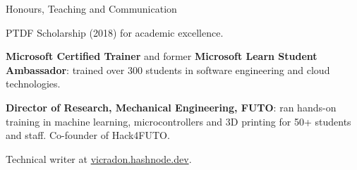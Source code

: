 \documentclass{resume}
\begin{document}
\begin{rSection}{Honours, Teaching and Communication}
\item PTDF Scholarship (2018) for academic excellence.
\item \textbf{Microsoft Certified Trainer} and former \textbf{Microsoft Learn Student Ambassador}: trained over 300 students in software engineering and cloud technologies.
\item \textbf{Director of Research, Mechanical Engineering, FUTO}: ran hands-on training in machine learning, microcontrollers and 3D printing for 50+ students and staff. Co-founder of Hack4FUTO.
\item Technical writer at \href{https://vicradon.hashnode.dev/}{vicradon.hashnode.dev}.
\end{rSection}
\end{document}
